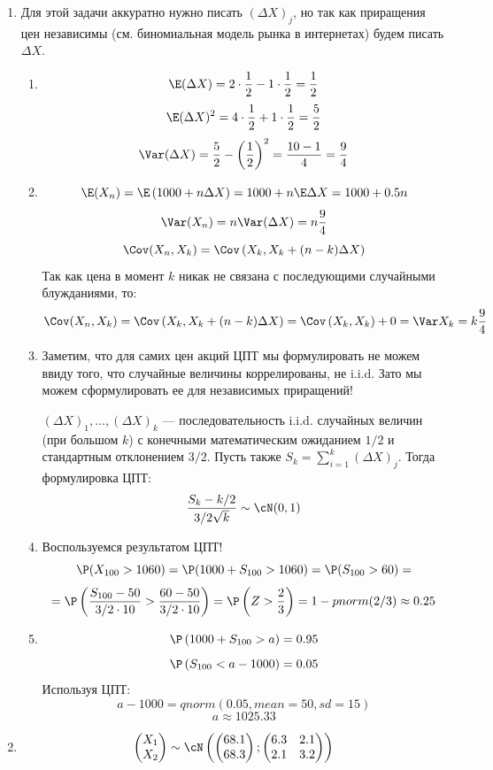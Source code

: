 \begin{enumerate}
\item
Для этой задачи аккуратно нужно писать \( \left(\Delta X \right)_j \), но так как приращения цен независимы (см. биномиальная модель рынка в интернетах) будем писать \( \Delta X \).
\begin{enumerate}
\item \[\E (\Delta X) = 2 \cdot \frac{1}{2} - 1 \cdot \frac{1}{2} = \frac{1}{2} \]
\[\E (\Delta X)^2 = 4 \cdot \frac{1}{2} + 1 \cdot \frac{1}{2} = \frac{5}{2} \]
\[\Var (\Delta X) = \frac{5}{2} - \left(\frac{1}{2}\right)^2 = \frac{10-1}{4}=\frac{9}{4} \]
\item \[\E (X_n) = \E \left(1000 + n\Delta X \right)  = 1000 + n \E \Delta X = 1000 + 0.5 n     \]
\[ \Var (X_n) = n \Var (\Delta X) = n \frac{9}{4}  \]
\[ \Cov (X_n, X_k) = \Cov \left(X_k, X_k + (n-k) \Delta X \right)     \]
Так как цена в момент $k$ никак не связана с последующими случайными блужданиями, то:
\[ \Cov (X_n, X_k) = \Cov \left(X_k, X_k + (n-k) \Delta X \right) =  \Cov \left(X_k, X_k \right) + 0 = \Var X_k = k \frac{9}{4}    \]
\item Заметим, что для самих цен акций ЦПТ мы формулировать не можем ввиду того, что случайные величины коррелированы, не i.i.d. Зато мы можем сформулировать ее для независимых приращений!

\( \left(\Delta X \right)_1, \ldots, \left(\Delta X \right)_{k} \) — последовательность i.i.d. случайных величин (при большом $k$) с конечными математическим ожиданием \(1/2 \) и стандартным отклонением \(3/2 \). Пусть также \( S_k = \sum_{i=1}^k \left(\Delta X \right)_j \). Тогда формулировка ЦПТ:
\[ \frac{S_k - k/2}{3/2 \sqrt{k}} \sim \cN(0,1)    \]
\item Воспользуемся результатом ЦПТ!
\[\P(X_{100} > 1060) = \P (1000 + S_{100} > 1060) = \P(S_{100} >60) = \]
\[ = \P \left(\frac{S_{100} -50 }{3/2\cdot 10} > \frac{60-50}{3/2 \cdot 10}\right) = \P \left(Z > \frac{2}{3}\right) = 1-pnorm(2/3) \approx 0.25   \]

\item \[ \P \left(1000 + S_{100} > a \right) = 0.95              \]
\[ \P \left( S_{100} < a-1000 \right) = 0.05              \]
Используя ЦПТ:
\[ a-1000 = qnorm(0.05, mean = 50, sd = 15 )            \]
\[ a \approx 1025.33   \]
\end{enumerate}

\item
\[\begin{pmatrix}
X_1 \\
X_2
\end{pmatrix} \sim \cN \left( \begin{pmatrix}
68.1 \\
68.3
\end{pmatrix} ; \begin{pmatrix}
6.3 & 2.1 \\
2.1 & 3.2
\end{pmatrix}                   \right)\]


\end{enumerate}
